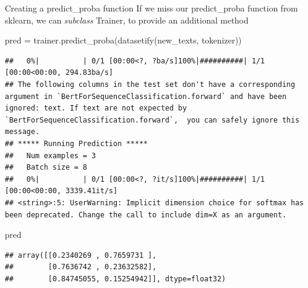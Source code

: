 \documentclass[
  10pt,
  ignorenonframetext,
  aspectratio=169]{beamer}
\newenvironment{Shaded}{\begin{snugshade}}{\end{snugshade}}
\newcommand{\NormalTok}[1]{\textcolor[rgb]{0.80,0.80,0.80}{#1}}
\newcommand{\OperatorTok}[1]{\textcolor[rgb]{0.94,0.94,0.82}{#1}}
\begin{document}
\begin{frame}[fragile]{Creating a predict\_proba function}
\protect\hypertarget{creating-a-predict_proba-function-1}{}
If we miss our predict\_proba function from sklearn, we can
\emph{subclass} Trainer, to provide an additional method

\medskip
\scriptsize

\begin{Shaded}
\begin{Highlighting}[]
\NormalTok{pred }\OperatorTok{=}\NormalTok{ trainer.predict\_proba(datasetify(new\_texts, tokenizer))}
\end{Highlighting}
\end{Shaded}

\begin{verbatim}
##   0%|          | 0/1 [00:00<?, ?ba/s]100%|##########| 1/1 [00:00<00:00, 294.83ba/s]
## The following columns in the test set don't have a corresponding argument in `BertForSequenceClassification.forward` and have been ignored: text. If text are not expected by `BertForSequenceClassification.forward`,  you can safely ignore this message.
## ***** Running Prediction *****
##   Num examples = 3
##   Batch size = 8
##   0%|          | 0/1 [00:00<?, ?it/s]100%|##########| 1/1 [00:00<00:00, 3339.41it/s]
## <string>:5: UserWarning: Implicit dimension choice for softmax has been deprecated. Change the call to include dim=X as an argument.
\end{verbatim}

\begin{Shaded}
\begin{Highlighting}[]
\NormalTok{pred}
\end{Highlighting}
\end{Shaded}

\begin{verbatim}
## array([[0.2340269 , 0.7659731 ],
##        [0.7636742 , 0.23632582],
##        [0.84745055, 0.15254942]], dtype=float32)
\end{verbatim}
\end{frame}
\end{document}

